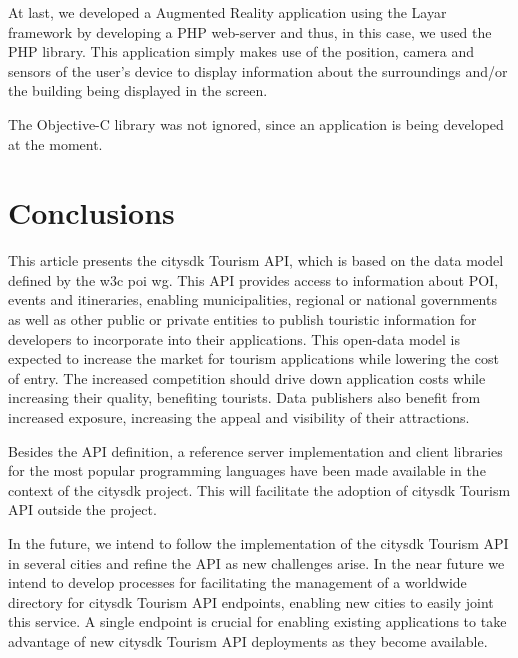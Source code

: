 \documentclass[times]{ettauth}
\begin{document}
At last, we developed a Augmented Reality application using the Layar framework by developing a PHP web-server and thus, in this case, we used the PHP library. 
This application simply makes use of the position, camera and sensors of the user's device to display information about the surroundings and/or the building being displayed in the screen.

The Objective-C library was not ignored, since an application is being developed at the moment.



\section{Conclusions}
\label{s:conclusions}
This article presents the \ac{citysdk} Tourism API, which is based on the data model defined by the \ac{w3c} \ac{poi} \ac{wg}.
This API provides access to information about \ac{POI}, events and itineraries, enabling municipalities, regional or national governments as well as other public or private entities to publish touristic information for developers to incorporate into their applications.
This open-data model is expected to increase the market for tourism applications while lowering the cost of entry.
The increased competition should drive down application costs while increasing their quality, benefiting tourists.
Data publishers also benefit from increased exposure, increasing the appeal and visibility of their attractions.

Besides the API definition, a reference server implementation and client libraries for the most popular programming languages have been made available in the context of the \ac{citysdk} project.
This will facilitate the adoption of \ac{citysdk} Tourism API outside the project.

In the future, we intend to follow the implementation of the \ac{citysdk} Tourism API in several cities and refine the API as new challenges arise.
In the near future we intend to develop processes for facilitating the management of a worldwide directory for \ac{citysdk} Tourism API endpoints, enabling new cities to easily joint this service.
A single endpoint is crucial for enabling existing applications to take advantage of new \ac{citysdk} Tourism API deployments as they become available.
\end{document}
